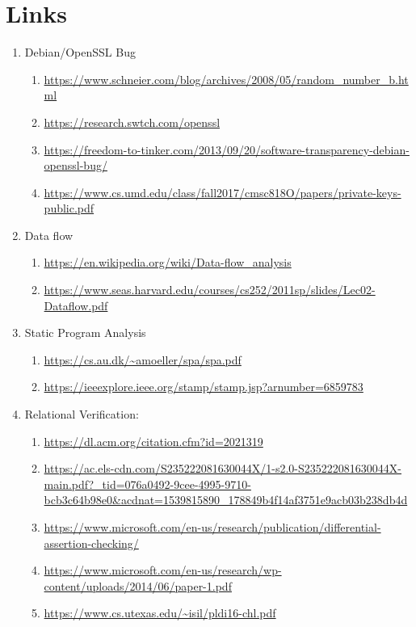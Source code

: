 \documentclass[letterpaper,twocolumn,10pt]{article}
\begin{document}
\section{Links}

\begin{enumerate}
	\item Debian/OpenSSL Bug 
		\begin{enumerate}
			\item \url{https://www.schneier.com/blog/archives/2008/05/random_number_b.html}
			\item \url{https://research.swtch.com/openssl}
			\item \url{https://freedom-to-tinker.com/2013/09/20/software-transparency-debian-openssl-bug/}
			\item \url{https://www.cs.umd.edu/class/fall2017/cmsc818O/papers/private-keys-public.pdf}
		\end{enumerate}
	\item Data flow
		\begin{enumerate}
			\item \url{https://en.wikipedia.org/wiki/Data-flow_analysis}
			\item \url{https://www.seas.harvard.edu/courses/cs252/2011sp/slides/Lec02-Dataflow.pdf}
		\end{enumerate}
	\item Static Program Analysis
		\begin{enumerate}
            \item \url{https://cs.au.dk/~amoeller/spa/spa.pdf}
            \item \url{https://ieeexplore.ieee.org/stamp/stamp.jsp?arnumber=6859783}
		\end{enumerate}
	\item Relational Verification:
		\begin{enumerate}
			\item \url{https://dl.acm.org/citation.cfm?id=2021319}
			\item \url{https://ac.els-cdn.com/S235222081630044X/1-s2.0-S235222081630044X-main.pdf?_tid=076a0492-9cee-4995-9710-bcb3c64b98e0&acdnat=1539815890_178849b4f14af3751e9acb03b238db4d}
			\item \url{https://www.microsoft.com/en-us/research/publication/differential-assertion-checking/}
			\item \url{https://www.microsoft.com/en-us/research/wp-content/uploads/2014/06/paper-1.pdf}
			\item \url{https://www.cs.utexas.edu/~isil/pldi16-chl.pdf}

\end{enumerate}
\end{enumerate}
\end{document}
